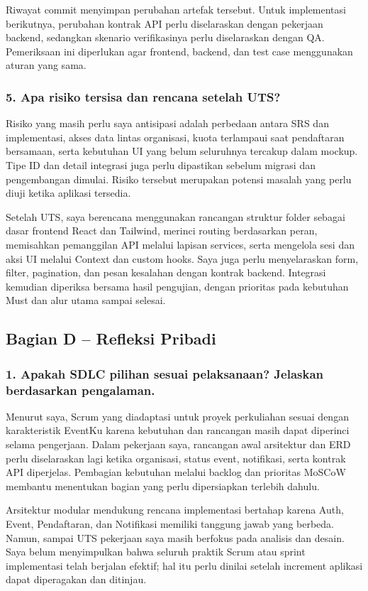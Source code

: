 \documentclass[11pt,a4paper]{article}
\begin{document}
Riwayat commit menyimpan perubahan artefak tersebut. Untuk implementasi berikutnya, perubahan kontrak API perlu diselaraskan dengan pekerjaan backend, sedangkan skenario verifikasinya perlu diselaraskan dengan QA. Pemeriksaan ini diperlukan agar frontend, backend, dan test case menggunakan aturan yang sama.

\subsubsection*{5. Apa risiko tersisa dan rencana setelah UTS?}
Risiko yang masih perlu saya antisipasi adalah perbedaan antara SRS dan implementasi, akses data lintas organisasi, kuota terlampaui saat pendaftaran bersamaan, serta kebutuhan UI yang belum seluruhnya tercakup dalam mockup. Tipe ID dan detail integrasi juga perlu dipastikan sebelum migrasi dan pengembangan dimulai. Risiko tersebut merupakan potensi masalah yang perlu diuji ketika aplikasi tersedia.

Setelah UTS, saya berencana menggunakan rancangan struktur folder sebagai dasar frontend React dan Tailwind, merinci routing berdasarkan peran, memisahkan pemanggilan API melalui lapisan services, serta mengelola sesi dan aksi UI melalui Context dan custom hooks. Saya juga perlu menyelaraskan form, filter, pagination, dan pesan kesalahan dengan kontrak backend. Integrasi kemudian diperiksa bersama hasil pengujian, dengan prioritas pada kebutuhan Must dan alur utama sampai selesai.

\subsection*{Bagian D -- Refleksi Pribadi}
\subsubsection*{1. Apakah SDLC pilihan sesuai pelaksanaan? Jelaskan berdasarkan pengalaman.}
Menurut saya, Scrum yang diadaptasi untuk proyek perkuliahan sesuai dengan karakteristik EventKu karena kebutuhan dan rancangan masih dapat diperinci selama pengerjaan. Dalam pekerjaan saya, rancangan awal arsitektur dan ERD perlu diselaraskan lagi ketika organisasi, status event, notifikasi, serta kontrak API diperjelas. Pembagian kebutuhan melalui backlog dan prioritas MoSCoW membantu menentukan bagian yang perlu dipersiapkan terlebih dahulu.

Arsitektur modular mendukung rencana implementasi bertahap karena Auth, Event, Pendaftaran, dan Notifikasi memiliki tanggung jawab yang berbeda. Namun, sampai UTS pekerjaan saya masih berfokus pada analisis dan desain. Saya belum menyimpulkan bahwa seluruh praktik Scrum atau sprint implementasi telah berjalan efektif; hal itu perlu dinilai setelah increment aplikasi dapat diperagakan dan ditinjau.
\end{document}
